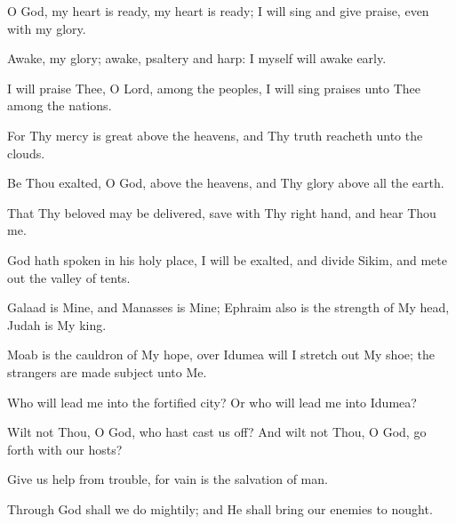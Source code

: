 O God, my heart is ready, my heart is ready; I will sing and give praise, even with my glory.

Awake, my glory; awake, psaltery and harp: I myself will awake early.

I will praise Thee, O Lord, among the peoples, I will sing praises unto Thee among the nations.

For Thy mercy is great above the heavens, and Thy truth reacheth unto the clouds.

Be Thou exalted, O God, above the heavens, and Thy glory above all the earth.

That Thy beloved may be delivered, save with Thy right hand, and hear Thou me.

God hath spoken in his holy place, I will be exalted, and divide Sikim, and mete out the valley of tents.

Galaad is Mine, and Manasses is Mine; Ephraim also is the strength of My head, Judah is My king.

Moab is the cauldron of My hope, over Idumea will I stretch out My shoe; the strangers are made subject unto Me.

Who will lead me into the fortified city? Or who will lead me into Idumea?

Wilt not Thou, O God, who hast cast us off? And wilt not Thou, O God, go forth with our hosts?

Give us help from trouble, for vain is the salvation of man.

Through God shall we do mightily; and He shall bring our enemies to nought.

